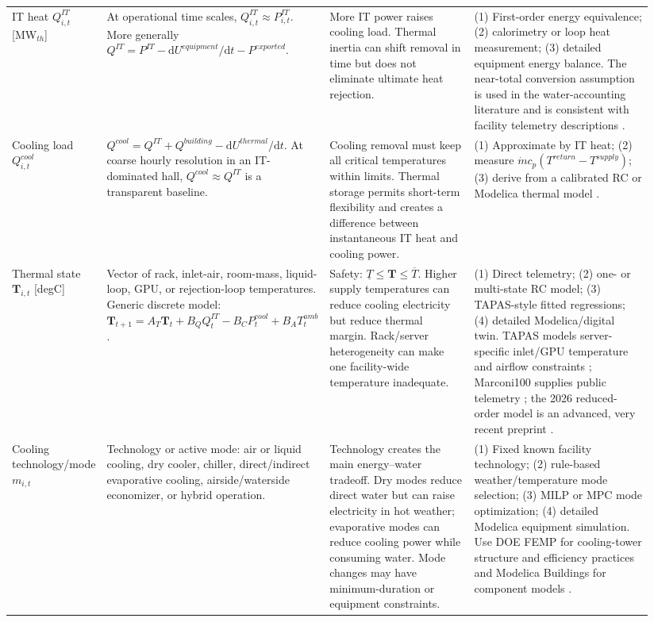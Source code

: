 \documentclass[10pt]{article}
\newcommand{\dd}{\mathrm{d}}
\begin{document}
\begin{landscape}
\begin{longtable}{@{}P{0.12\linewidth}P{0.27\linewidth}P{0.25\linewidth}P{0.30\linewidth}@{}}
IT heat $Q^{IT}_{i,t}$ [MW$_{th}$] & At operational time scales, $Q^{IT}_{i,t}\approx P^{IT}_{i,t}$. More generally $Q^{IT}=P^{IT}-\dd U^{equipment}/\dd t-P^{exported}$. & More IT power raises cooling load. Thermal inertia can shift removal in time but does not eliminate ultimate heat rejection. & (1) First-order energy equivalence; (2) calorimetry or loop heat measurement; (3) detailed equipment energy balance. The near-total conversion assumption is used in the water-accounting literature \cite{li2023thirsty} and is consistent with facility telemetry descriptions \cite{borghesi2023m100}. \\

Cooling load $Q^{cool}_{i,t}$ & $Q^{cool}=Q^{IT}+Q^{building}-\dd U^{thermal}/\dd t$. At coarse hourly resolution in an IT-dominated hall, $Q^{cool}\approx Q^{IT}$ is a transparent baseline. & Cooling removal must keep all critical temperatures within limits. Thermal storage permits short-term flexibility and creates a difference between instantaneous IT heat and cooling power. & (1) Approximate by IT heat; (2) measure $\dot m c_p(T^{return}-T^{supply})$; (3) derive from a calibrated RC or Modelica thermal model \cite{ngwerume2026thermal,modelicaBuildings}. \\

Thermal state $\mathbf T_{i,t}$ [degC] & Vector of rack, inlet-air, room-mass, liquid-loop, GPU, or rejection-loop temperatures. Generic discrete model: $\mathbf T_{t+1}=A_T\mathbf T_t+B_QQ^{IT}_t-B_CP^{cool}_t+B_AT^{amb}_t$. & Safety: $\underline T\le\mathbf T\le\overline T$. Higher supply temperatures can reduce cooling electricity but reduce thermal margin. Rack/server heterogeneity can make one facility-wide temperature inadequate. & (1) Direct telemetry; (2) one- or multi-state RC model; (3) TAPAS-style fitted regressions; (4) detailed Modelica/digital twin. TAPAS models server-specific inlet/GPU temperature and airflow constraints \cite{stojkovic2025tapas}; Marconi100 supplies public telemetry \cite{borghesi2023m100}; the 2026 reduced-order model is an advanced, very recent preprint \cite{ngwerume2026thermal}. \\

Cooling technology/mode $m_{i,t}$ & Technology or active mode: air or liquid cooling, dry cooler, chiller, direct/indirect evaporative cooling, airside/waterside economizer, or hybrid operation. & Technology creates the main energy--water tradeoff. Dry modes reduce direct water but can raise electricity in hot weather; evaporative modes can reduce cooling power while consuming water. Mode changes may have minimum-duration or equipment constraints. & (1) Fixed known facility technology; (2) rule-based weather/temperature mode selection; (3) MILP or MPC mode optimization; (4) detailed Modelica equipment simulation. Use DOE FEMP for cooling-tower structure and efficiency practices \cite{fempCooling} and Modelica Buildings for component models \cite{modelicaBuildings}. \\


\end{longtable}
\end{landscape}
\end{document}
